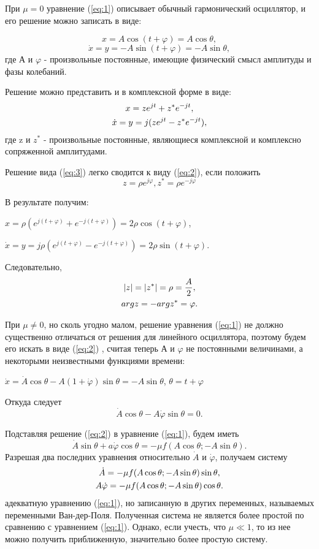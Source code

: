 При $\mu=0$ уравнение (\ref{eq:1}) описывает обычный гармонический осциллятор, и его решение можно записать в виде:

$$x=A\cos(t+\varphi)=A\cos\theta,$$
\begin{equation}
\label{eq:2}
\dot{x}=y=-A\sin(t+\varphi)=-A\sin\theta,
\end{equation}
где А и $\varphi$ - произвольные постоянные, имеющие физический смысл амплитуды и фазы колебаний. 

\newpage
Решение можно представить и в комплексной форме в виде: 
\begin{gather}
\label{eq:3}
x=ze^{jt}+z^*e^{-jt},\\\notag
\dot{x}=y=j(ze^{jt}-z^*e^{-jt}),
\end{gather}
где z и $z^*$ - произвольные постоянные, являющиеся комплексной и комплексно сопряженной амплитудами.  

Решение вида  (\ref{eq:3}) легко сводится к виду  (\ref{eq:2}), если положить $$z=\rho e^{j\varphi}, z^*=\rho e^{-j\varphi}$$

В результате получим:

\begin{center}
$x=\rho(e^{j(t+\varphi)}+e^{-j(t+\varphi)})=2\rho \cos(t+\varphi)$,

$\dot{x}=y=j\rho(e^{j(t+\varphi)}-e^{-j(t+\varphi)})=2\rho \sin(t+\varphi)$.
\end{center}
Следовательно, 
\begin{gather}
\label{eq:4}
|z|=|z^*|=\rho=\frac{A}{2},\\\notag
argz=-argz^*=\varphi.
\end{gather}

При $\mu \ne 0$, но сколь угодно малом, решение уравнения (\ref{eq:1})  не должно существенно отличаться от решения для линейного осциллятора, поэтому будем его искать в виде (\ref{eq:2}) , считая теперь А и $\varphi$ не постоянными величинами, а некоторыми неизвестными функциями времени:

\begin{center}
$\dot{x}=\dot{A} \cos\theta-A(1+\dot \varphi)\sin\theta=-A\sin\theta$, $\theta=t+\varphi$
\end{center}

Откуда следует $$\dot{A}\cos\theta-A\dot \varphi \sin\theta=0.$$

Подставляя решение  (\ref{eq:2}) в уравнение  (\ref{eq:1}), будем иметь $$\dot{A}\sin\theta+a\dot \varphi \cos\theta=-\mu f(A\cos\theta;-A\sin\theta).$$
Разрешая два последних уравнения относительно $\dot{A}$ и $\dot{\varphi}$, получаем систему
\begin{gather}
\label{eq:5}
\dot{A}=-\mu f(A\cos\theta;-A\sin\theta)\sin\theta,\\\notag
A\dot{\varphi}=-\mu f(A\cos\theta;-A\sin\theta) \cos\theta.
\end{gather}
адекватную уравнению (\ref{eq:1}), но записанную в других переменных, называемых переменными Ван-дер-Поля. Полученная система не является более простой по сравнению с уравнением (\ref{eq:1}). Однако, если учесть, что $\mu \ll 1$, то из нее можно получить приближенную, значительно более простую систему.

